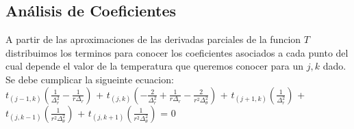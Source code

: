 \subsection{Análisis de Coeficientes}
A partir de las aproximaciones de las derivadas parciales de la funcion $T$ distribuimos los terminos para conocer los coeficientes asociados a cada punto del cual depende el valor de la temperatura que queremos conocer para un $j,k$ dado. Se debe cumplicar la sigueinte ecuacion: \\
$t_{(j-1, k)} (\frac{1}{\Delta^2_r}-\frac{1}{r \Delta_r})$ +
$t_{(j, k)} (-\frac{2}{\Delta^2_r}+\frac{1}{r \Delta_r}-\frac{2}{r^2 \Delta^2_\theta})$ + 
$t_{(j+1, k)} (\frac{1}{\Delta^2_r})$ + \\
$t_{(j, k-1)} (\frac{1}{r^2 \Delta^2_\theta})$ +
$t_{(j, k+1)} (\frac{1}{r^2 \Delta^2_\theta})$ = 0 \\

